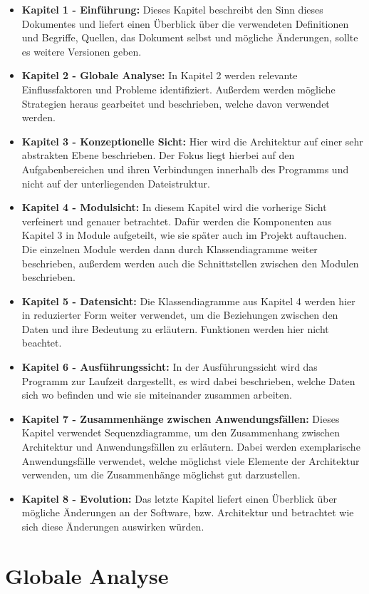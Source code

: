\documentclass[fontsize=12pt,paper=a4,twoside]{scrartcl}
\begin{document}
\begin{itemize}
\item \textbf{Kapitel 1 - Einführung:} Dieses Kapitel beschreibt den Sinn dieses Dokumentes und liefert einen Überblick über die verwendeten Definitionen und Begriffe, Quellen, das Dokument selbst und mögliche Änderungen, sollte es weitere Versionen geben.
\item \textbf{Kapitel 2 - Globale Analyse:} In Kapitel 2 werden relevante Einflussfaktoren und Probleme identifiziert. Außerdem werden mögliche Strategien heraus gearbeitet und beschrieben, welche davon verwendet werden.
\item \textbf{Kapitel 3 - Konzeptionelle Sicht:} Hier wird die Architektur auf einer sehr abstrakten Ebene beschrieben. Der Fokus liegt hierbei auf den Aufgabenbereichen und ihren Verbindungen innerhalb des Programms und nicht auf der unterliegenden Dateistruktur.
\item \textbf{Kapitel 4 - Modulsicht:} In diesem Kapitel wird die vorherige Sicht verfeinert und genauer betrachtet. Dafür werden die Komponenten aus Kapitel 3 in Module aufgeteilt, wie sie später auch im Projekt auftauchen. Die einzelnen Module werden dann durch Klassendiagramme weiter beschrieben, außerdem werden auch die Schnittstellen zwischen den Modulen beschrieben.
\item \textbf{Kapitel 5 - Datensicht:} Die Klassendiagramme aus Kapitel 4 werden hier in reduzierter Form weiter verwendet, um die Beziehungen zwischen den Daten und ihre Bedeutung zu erläutern. Funktionen werden hier nicht beachtet.
\item \textbf{Kapitel 6 - Ausführungssicht:} In der Ausführungssicht wird das Programm zur Laufzeit dargestellt, es wird dabei beschrieben, welche Daten sich wo befinden und wie sie miteinander zusammen arbeiten.
\item \textbf{Kapitel 7 - Zusammenhänge zwischen Anwendungsfällen:} Dieses Kapitel verwendet Sequenzdiagramme, um den Zusammenhang zwischen Architektur und Anwendungsfällen zu erläutern. Dabei werden exemplarische Anwendungsfälle verwendet, welche möglichst viele Elemente der Architektur verwenden, um die Zusammenhänge möglichst gut darzustellen.
\item \textbf{Kapitel 8 - Evolution:} Das letzte Kapitel liefert einen Überblick über mögliche Änderungen an der Software, bzw. Architektur und betrachtet wie sich diese Änderungen auswirken würden.
\end{itemize}

\section{Globale Analyse}
\label{sec:globale_analyse}
\end{document}
